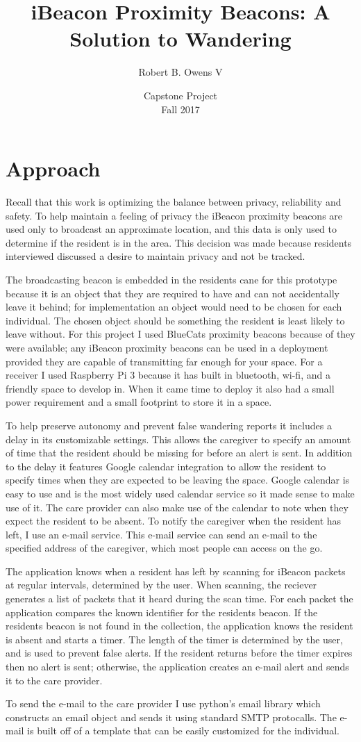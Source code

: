 \documentclass[11pt]{article}
\title{iBeacon Proximity Beacons: A Solution to Wandering}
\author{Robert B. Owens V}
\date{\small Capstone Project\\[.5em]
\small Fall 2017}
\begin{document}
\maketitle

\section{Approach}
Recall that this work is optimizing the balance between privacy, reliability and safety. To help maintain a feeling of privacy the iBeacon proximity beacons are used only to broadcast an approximate location, and this data is only used to determine if the resident is in the area. This decision was made because residents interviewed discussed a desire to maintain privacy and not be tracked\cite{robinson}.

The broadcasting beacon is embedded in the residents cane for this prototype because it is an object that they are required to have and can not accidentally leave it behind; for implementation an object would need to be chosen for each individual. The chosen object should be something the resident is least likely to leave without. For this project I used BlueCats proximity beacons\cite{bluecats} because of they were available; any iBeacon proximity beacons can be used in a deployment provided they are capable of transmitting far enough for your space. For a receiver I used Raspberry Pi 3 because it has built in bluetooth, wi-fi, and a friendly space to develop in. When it came time to deploy it also had a small power requirement and a small footprint to store it in a space. 

To help preserve autonomy and prevent false wandering reports it includes a delay in its customizable settings. This allows the caregiver to specify an amount of time that the resident should be missing for before an alert is sent. In addition to the delay it features Google calendar integration to allow the resident to specify times when they are expected to be leaving the space. Google calendar is easy to use and is the most widely used calendar service\cite{henry} so it made sense to make use of it. The care provider can also make use of the calendar to note when they expect the resident to be absent. To notify the caregiver when the resident has left, I use an e-mail service. This e-mail service can send an e-mail to the specified address of the caregiver, which most people can access on the go. 

The application knows when a resident has left by scanning for iBeacon packets at regular intervals, determined by the user. When scanning, the reciever generates a list of packets that it heard during the scan time. For each packet the application compares the known identifier for the residents beacon. If the residents beacon is not found in the collection, the application knows the resident is absent and starts a timer. The length of the timer is determined by the user, and is used to prevent false alerts. If the resident returns before the timer expires then no alert is sent; otherwise, the application creates an e-mail alert and sends it to the care provider. 

To send the e-mail to the care provider I use python's email library which constructs an email object and sends it using standard SMTP protocalls. The e-mail is built off of a template that can be easily customized for the individual. 
 
 


\printbibliography
\end{document}
